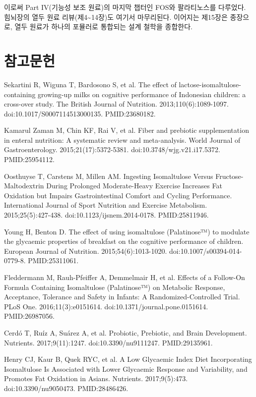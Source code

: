 \documentclass[12pt,oneside]{book}
\newcommand{\refstart}{\par\begingroup\fontsize{8.5pt}{10.2pt}\selectfont\setlength{\parskip}{1.4pt}\raggedright}
\newcommand{\reff}[2]{\par\hangindent=7mm\hangafter=1\noindent[#1]\hspace{2mm}#2\par}
\begin{document}
이로써 Part IV(기능성 보조 원료)의 마지막 챕터인 FOS와 팔라티노스를 다루었다. 힘뇌장의 열두 원료 리뷰(제4\textasciitilde{}14장)도 여기서 마무리된다. 이어지는 제15장은 종장으로, 열두 원료가 하나의 포뮬러로 통합되는 설계 철학을 종합한다.

\section*{참고문헌}

\refstart

\reff{1}{Sekartini R, Wiguna T, Bardosono S, et al. The effect of lactose-isomaltulose-containing growing-up milks on cognitive performance of Indonesian children: a cross-over study. The British Journal of Nutrition. 2013;110(6):1089-1097. doi:10.1017/S0007114513000135. PMID:23680182.}

\reff{2}{Kamarul Zaman M, Chin KF, Rai V, et al. Fiber and prebiotic supplementation in enteral nutrition: A systematic review and meta-analysis. World Journal of Gastroenterology. 2015;21(17):5372-5381. doi:10.3748/wjg.v21.i17.5372. PMID:25954112.}

\reff{3}{Oosthuyse T, Carstens M, Millen AM. Ingesting Isomaltulose Versus Fructose-Maltodextrin During Prolonged Moderate-Heavy Exercise Increases Fat Oxidation but Impairs Gastrointestinal Comfort and Cycling Performance. International Journal of Sport Nutrition and Exercise Metabolism. 2015;25(5):427-438. doi:10.1123/ijsnem.2014-0178. PMID:25811946.}

\reff{4}{Young H, Benton D. The effect of using isomaltulose (Palatinose™) to modulate the glycaemic properties of breakfast on the cognitive performance of children. European Journal of Nutrition. 2015;54(6):1013-1020. doi:10.1007/s00394-014-0779-8. PMID:25311061.}

\reff{5}{Fleddermann M, Rauh-Pfeiffer A, Demmelmair H, et al. Effects of a Follow-On Formula Containing Isomaltulose (Palatinose™) on Metabolic Response, Acceptance, Tolerance and Safety in Infants: A Randomized-Controlled Trial. PLoS One. 2016;11(3):e0151614. doi:10.1371/journal.pone.0151614. PMID:26987056.}

\reff{6}{Cerdó T, Ruíz A, Suárez A, et al. Probiotic, Prebiotic, and Brain Development. Nutrients. 2017;9(11):1247. doi:10.3390/nu9111247. PMID:29135961.}

\reff{7}{Henry CJ, Kaur B, Quek RYC, et al. A Low Glycaemic Index Diet Incorporating Isomaltulose Is Associated with Lower Glycaemic Response and Variability, and Promotes Fat Oxidation in Asians. Nutrients. 2017;9(5):473. doi:10.3390/nu9050473. PMID:28486426.}
\end{document}
